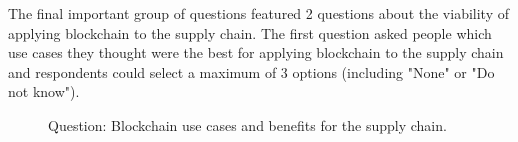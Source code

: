
The final important group of questions featured 2 questions about the viability of applying blockchain to the supply chain. The first question asked people which use cases they thought were the best for applying blockchain to the supply chain and respondents could select a maximum of 3 options (including "None" or "Do not know").

\begin{figure}[h]

    
      \caption{Question: Blockchain use cases and benefits for the supply chain.}
    \label{fig:group4_graphics}
\end{figure}

